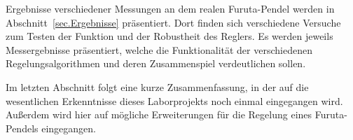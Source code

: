 Ergebnisse verschiedener Messungen an dem realen Furuta-Pendel werden in Abschnitt~\ref{sec.Ergebnisse} präsentiert. 
Dort finden sich verschiedene Versuche zum Testen der Funktion und der Robustheit des Reglers.
Es werden jeweils Messergebnisse präsentiert, welche die Funktionalität der verschiedenen Regelungsalgorithmen und deren Zusammenspiel verdeutlichen sollen.

Im letzten Abschnitt folgt eine kurze Zusammenfassung, in der auf die wesentlichen Erkenntnisse dieses Laborprojekts noch einmal eingegangen wird.
Außerdem wird hier auf mögliche Erweiterungen für die Regelung eines Furuta-Pendels eingegangen.

